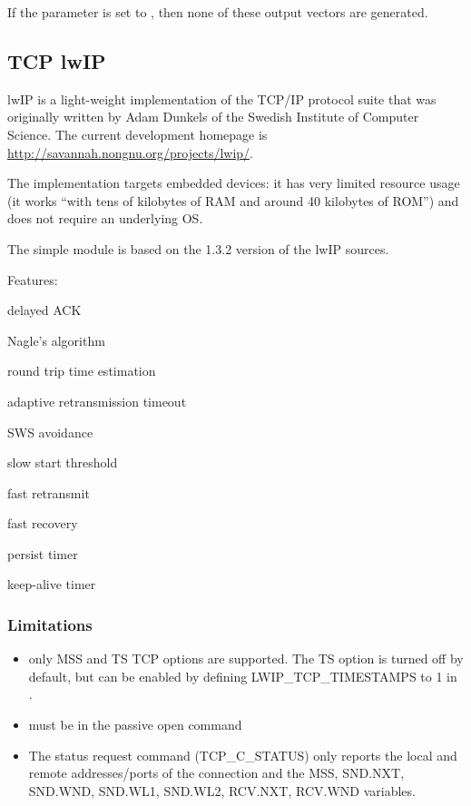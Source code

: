 If the  parameter is set to , then none
of these output vectors are generated.

%
%

\subsection{TCP lwIP}
\label{sec:tcp_lwip}

lwIP is a light-weight implementation of the TCP/IP protocol suite
that was originally written by Adam Dunkels of the Swedish Institute of
Computer Science. The current development homepage is
\url{http://savannah.nongnu.org/projects/lwip/}.

The implementation targets embedded devices: it has
very limited resource usage (it works ``with tens of kilobytes of RAM and
around 40 kilobytes of ROM'') and does not require an underlying OS.

The  simple module is based on the 1.3.2 version of
the lwIP sources.

Features:

\begin{compactitem}
\item delayed ACK
\item Nagle's algorithm
\item round trip time estimation
\item adaptive retransmission timeout
\item SWS avoidance
\item slow start threshold
\item fast retransmit
\item fast recovery
\item persist timer
\item keep-alive timer
\end{compactitem}

\subsubsection*{Limitations}

\begin{itemize}
  \item only MSS and TS TCP options are supported. The TS option is turned off
        by default, but can be enabled by defining LWIP\_TCP\_TIMESTAMPS to 1
        in .
  \item {} must be  in the passive open command
  \item The status request command (TCP\_C\_STATUS) only reports the
          local and remote addresses/ports of the connection and
          the MSS, SND.NXT, SND.WND, SND.WL1, SND.WL2, RCV.NXT, RCV.WND variables.
\end{itemize}

